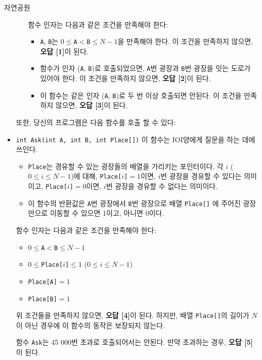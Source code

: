 \begin{problem}{자연공원}
\begin{itemize}
\begin{itemize}
			함수 인자는 다음과 같은 조건을 만족해야 한다:
		
			\begin{itemize}
				\item \texttt{A}, \texttt{B}는 $0 \le $\texttt{A}$ < $\texttt{B}$ \le N-1$을 만족해야 한다. 이 조건을 만족하지 않으면, \textbf{오답 [1]}이 된다.
				\item 함수가 인자 (\texttt{A}, \texttt{B})로 호출되었으면, \texttt{A}번 광장과  \texttt{B}번 광장을 잇는 도로가 있어야 한다. 이 조건을 만족하지 않으면, \textbf{오답 [2]}이 된다.
				\item 이 함수는 같은 인자 (\texttt{A}, \texttt{B})로 두 번 이상 호출되면 안된다. 이 조건을 만족하지 않으면, \textbf{오답 [3]}이 된다.
			\end{itemize}
		\end{itemize}
	
		또한, 당신의 프로그램은 다음 함수를 호출 할 수 있다:
		\item \texttt{int Ask(int A, int B, int Place[])}
		이 함수는 IOI양에게 질문을 하는 데에 쓰인다.
		\begin{itemize}
			\item \texttt{Place}는 경유할 수 있는 광장들의 배열을 가리키는 포인터이다. 각 $i$ ($0 \le i \le N-1$)에 대해, \texttt{Place[}$i$\texttt{]}$=1$이면, $i$번 광장을 경유할 수 있다는 의미이고, \texttt{Place[}$i$\texttt{]}$=0$이면, $i$번 광장을 경유할 수 없다는 의미이다.
			\item 이 함수의 반환값은 \texttt{A}번 광장에서 \texttt{B}번 광장으로 배열 \texttt{Place[]} 에 주어진 광장 만으로 이동할 수 있으면 1이고, 아니면 0이다.
		\end{itemize}
	
	
		함수 인자는 다음과 같은 조건을 만족해야 한다:
		
		\begin{itemize}
			\item $0 \le $\texttt{A}$ < $\texttt{B}$ \le N-1$
			\item $0 \le$\texttt{Place[}$i$\texttt{]}$\le 1$  ($0 \le i \le N-1$)
			\item \texttt{Place[A]}$=1$
			\item \texttt{Place[B]}$=1$
		\end{itemize}
	
		위 조건들을 만족하지 않으면, \textbf{오답 [4]}이 된다. 하지만, 배열 \texttt{Place[]}의 길이가 $N$이 아닌 경우에 이 함수의 동작은 보장되지 않는다.
		
		함수 \texttt{Ask}는 45 000번 초과로 호출되어서는 안된다. 만약 초과하는 경우, \textbf{오답 [5]}이 된다.
		

\end{itemize}
\end{problem}
